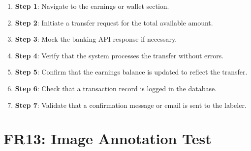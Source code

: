 \documentclass[12pt, titlepage]{article}
\begin{document}
\begin{enumerate}
\begin{itemize}
\begin{enumerate}
            \item \textbf{Step 1}: Navigate to the earnings or wallet section.
            \item \textbf{Step 2}: Initiate a transfer request for the total available amount.
            \item \textbf{Step 3}: Mock the banking API response if necessary.
            \item \textbf{Step 4}: Verify that the system processes the transfer without errors.
            \item \textbf{Step 5}: Confirm that the earnings balance is updated to reflect the transfer.
            \item \textbf{Step 6}: Check that a transaction record is logged in the database.
            \item \textbf{Step 7}: Validate that a confirmation message or email is sent to the labeler.
        \end{enumerate}
    \end{itemize}
\end{enumerate}

\section*{FR13: Image Annotation Test}
\end{document}
